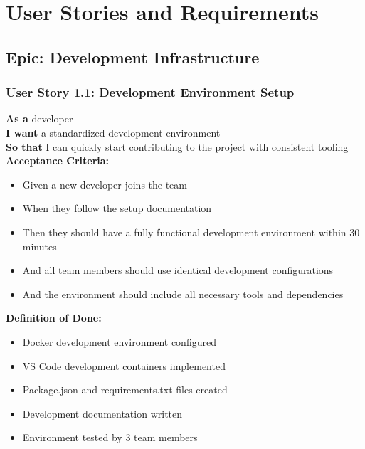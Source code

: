 \section{User Stories and Requirements}

\subsection{Epic: Development Infrastructure}

\subsubsection{User Story 1.1: Development Environment Setup}

\begin{tcolorbox}[colback=lightgray, colframe=primaryblue, title=US-1.1: Development Environment Setup]
\textbf{As a} developer \\
\textbf{I want} a standardized development environment \\
\textbf{So that} I can quickly start contributing to the project with consistent tooling \\

\textbf{Acceptance Criteria:}
\begin{itemize}
    \item Given a new developer joins the team
    \item When they follow the setup documentation
    \item Then they should have a fully functional development environment within 30 minutes
    \item And all team members should use identical development configurations
    \item And the environment should include all necessary tools and dependencies
\end{itemize}

\textbf{Definition of Done:}
\begin{itemize}
    \item Docker development environment configured
    \item VS Code development containers implemented
    \item Package.json and requirements.txt files created
    \item Development documentation written
    \item Environment tested by 3 team members
\end{itemize}
\end{tcolorbox}

